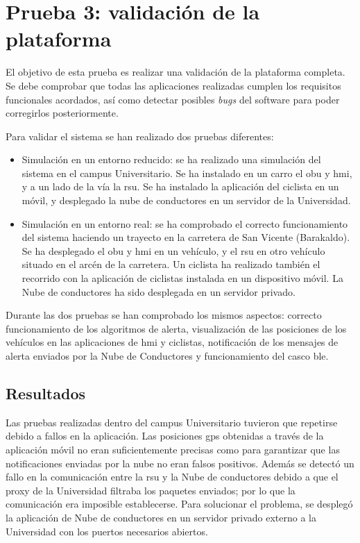\section{Prueba 3: validación de la plataforma}
El objetivo de esta prueba es realizar una validación de la plataforma
completa. Se debe comprobar que todas las aplicaciones realizadas cumplen los
requisitos funcionales acordados, así como detectar posibles \emph{bugs} del
software para poder corregirlos posteriormente.

Para validar el sistema se han realizado dos pruebas diferentes:

\begin{itemize}
	\item Simulación en un entorno reducido: se ha realizado una simulación	del
	sistema en el campus Universitario. Se ha instalado en un carro el \gls{obu}
	y \gls{hmi}, y a un lado de la vía la \gls{rsu}. Se ha instalado la
	aplicación del ciclista en un móvil, y desplegado la nube de conductores en
	un servidor de la Universidad.

	\item Simulación en un entorno real: se ha comprobado el correcto
	funcionamiento del sistema haciendo un trayecto en la carretera de San
	Vicente (Barakaldo). Se ha desplegado el \gls{obu} y \gls{hmi} en un
	vehículo,	y el \gls{rsu} en otro vehículo situado en el arcén de la
	carretera. Un ciclista ha realizado también el recorrido con la aplicación
	de ciclistas instalada en un dispositivo móvil. La Nube de conductores ha
	sido desplegada en un servidor privado.
\end{itemize}

Durante las dos pruebas se han comprobado los mismos aspectos: correcto
funcionamiento de los algoritmos de alerta, visualización de las posiciones
de los vehículos en las aplicaciones de \gls{hmi} y ciclistas, notificación
de los mensajes de alerta enviados por la Nube de Conductores y
funcionamiento del casco \gls{ble}.

\subsection{Resultados}
Las pruebas realizadas dentro del campus Universitario tuvieron que repetirse
debido a fallos en la aplicación. Las posiciones \gls{gps} obtenidas a través
de la aplicación móvil no eran suficientemente precisas como para garantizar
que las notificaciones enviadas por la nube no eran falsos positivos. Además
se detectó un fallo en la comunicación entre la \gls{rsu} y la Nube de
conductores debido a que el proxy de la Universidad filtraba los paquetes
enviados; por lo que la comunicación era imposible establecerse. Para
solucionar el problema, se desplegó la aplicación de Nube de conductores en
un servidor privado externo a la Universidad con los puertos necesarios
abiertos.


